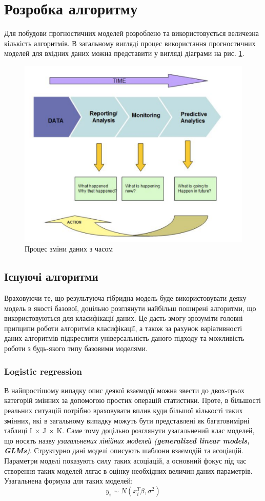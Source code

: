 \section{Розробка алгоритму}

Для побудови прогностичних моделей розроблено та використовується величезна кількість алгоритмів. В загальному вигляді процес використання прогностичних моделей для вхідних даних можна представити у вигляді діаграми на рис. \ref{fig:data_process}.

\begin{figure}[h!]
  \centering
  \includegraphics[width=0.7\linewidth]{figures/data_process.png}
  \caption{Процес зміни даних з часом}
  \label{fig:data_process}
\end{figure}

\subsection{Існуючі алгоритми}
Враховуючи те, що результуюча гібридна модель буде використовувати деяку модель в якості базової, доцільно розглянути найбільш поширені алгоритми, що використовуються для класифікації даних. Це дасть змогу зрозуміти головні припципи роботи алгоритмів класифікації, а також за рахунок варіативності даних алгоритмів підкреслити універсальність даного підходу та можливість роботи з будь-якого типу базовими моделями.

\subsubsection{Logistic regression}
В найпростішому випадку опис деякої взаємодії можна звести до двох-трьох категорій змінних за допомогою простих операцій статистики. Проте, в більшості реальних ситуацій потрібно враховувати вплив куди більшої кількості таких змінних, які в загальному випадку можуть бути представлені як багатовимірні таблиці  I × J × K. Саме тому доцільно розглянути узагальнений клас моделей, що носять назву \textit{узагальнених лінійних моделей (\textbf{generalized linear models, GLMs})}. Структурно дані моделі описують шаблони взаємодій та асоціацій. Параметри моделі показують силу таких асоціацій, а основний фокус під час створення таких моделей лягає в оцінку необхідних величин даних параметрів. Узагальнена формула для таких моделей:
\begin{equation}
    \label{eq:logistic_regression}
    y_{i} \sim N(x_{i}^T\beta, \sigma^2)
\end{equation}


